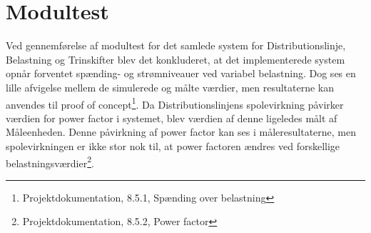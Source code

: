 
\section{Modultest}

Ved gennemførelse af modultest for det samlede system for Distributionslinje, Belastning og Trinskifter blev det konkluderet, at det implementerede system opnår forventet spænding- og strømniveauer ved variabel belastning. Dog ses en lille afvigelse mellem de simulerede og målte værdier, men resultaterne kan anvendes til proof of concept\footnote{Projektdokumentation, 8.5.1, Spænding over belastning}. Da Distributionslinjens spolevirkning påvirker værdien for power factor i systemet, blev værdien af denne ligeledes målt af Måleenheden. Denne påvirkning af power factor kan ses i måleresultaterne, men spolevirkningen er ikke stor nok til, at power factoren ændres ved forskellige belastningsværdier\footnote{Projektdokumentation, 8.5.2, Power factor}. 
